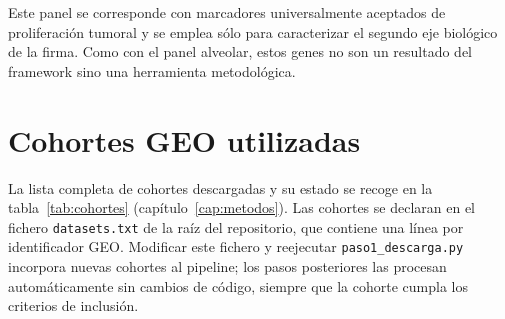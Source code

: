 Este panel se corresponde con marcadores universalmente aceptados de
proliferación tumoral y se emplea sólo para caracterizar el segundo eje
biológico de la firma. Como con el panel alveolar, estos genes no son
un resultado del framework sino una herramienta metodológica.

\section*{Cohortes GEO utilizadas}
{}

La lista completa de cohortes descargadas y su estado se recoge en la
tabla~\ref{tab:cohortes} (capítulo~\ref{cap:metodos}). Las cohortes se
declaran en el fichero \texttt{datasets.txt} de la raíz del repositorio,
que contiene una línea por identificador GEO. Modificar este fichero y
reejecutar \texttt{paso1\_descarga.py} incorpora nuevas cohortes al
pipeline; los pasos posteriores las procesan automáticamente sin cambios
de código, siempre que la cohorte cumpla los criterios de inclusión.
